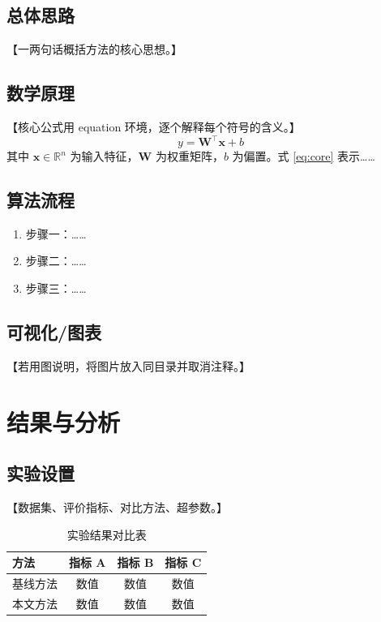 \documentclass[12pt,a4paper]{article}
\begin{document}
\subsection{总体思路}
【一两句话概括方法的核心思想。】

\subsection{数学原理}
【核心公式用 equation 环境，逐个解释每个符号的含义。】
\begin{equation}
    y = \mathbf{W}^{\top} \mathbf{x} + b
    \label{eq:core}
\end{equation}
其中 $\mathbf{x} \in \mathbb{R}^n$ 为输入特征，$\mathbf{W}$ 为权重矩阵，$b$ 为偏置。式 \eqref{eq:core} 表示……

\subsection{算法流程}
\begin{enumerate}[leftmargin=2em]
    \item 步骤一：……
    \item 步骤二：……
    \item 步骤三：……
\end{enumerate}

\subsection{可视化/图表}
【若用图说明，将图片放入同目录并取消注释。】

\section{结果与分析}
\subsection{实验设置}
【数据集、评价指标、对比方法、超参数。】
\begin{table}[htbp]
    \centering
    \begin{tabular}{lccc}
        \hline
        \textbf{方法} & \textbf{指标 A} & \textbf{指标 B} & \textbf{指标 C} \\
        \hline
        基线方法 & 数值 & 数值 & 数值 \\
        本文方法 & 数值 & 数值 & 数值 \\
        \hline
    \end{tabular}
    \caption{实验结果对比表}
\end{table}
\end{document}
